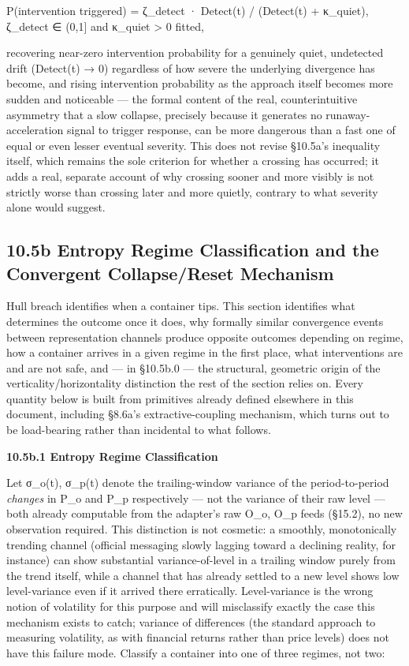 \documentclass[
]{article}
\begin{document}
P(intervention triggered) = ζ\_detect · Detect(t) / (Detect(t) +
κ\_quiet), ζ\_detect ∈ (0,1{]} and κ\_quiet \textgreater{} 0 fitted,

recovering near-zero intervention probability for a genuinely quiet,
undetected drift (Detect(t) → 0) regardless of how severe the underlying
divergence has become, and rising intervention probability as the
approach itself becomes more sudden and noticeable --- the formal
content of the real, counterintuitive asymmetry that a slow collapse,
precisely because it generates no runaway-acceleration signal to trigger
response, can be more dangerous than a fast one of equal or even lesser
eventual severity. This does not revise §10.5a's inequality itself,
which remains the sole criterion for whether a crossing has occurred; it
adds a real, separate account of why crossing sooner and more visibly is
not strictly worse than crossing later and more quietly, contrary to
what severity alone would suggest.

\hypertarget{b-entropy-regime-classification-and-the-convergent-collapsereset-mechanism}{%
\subsection{10.5b Entropy Regime Classification and the Convergent
Collapse/Reset
Mechanism}\label{b-entropy-regime-classification-and-the-convergent-collapsereset-mechanism}}

Hull breach identifies when a container tips. This section identifies
what determines the outcome once it does, why formally similar
convergence events between representation channels produce opposite
outcomes depending on regime, how a container arrives in a given regime
in the first place, what interventions are and are not safe, and --- in
§10.5b.0 --- the structural, geometric origin of the
verticality/horizontality distinction the rest of the section relies on.
Every quantity below is built from primitives already defined elsewhere
in this document, including §8.6a's extractive-coupling mechanism, which
turns out to be load-bearing rather than incidental to what follows.

\textbf{10.5b.1 Entropy Regime Classification}

Let σ\_o(t), σ\_p(t) denote the trailing-window variance of the
period-to-period \emph{changes} in P\_o and P\_p respectively --- not
the variance of their raw level --- both already computable from the
adapter's raw O\_o, O\_p feeds (§15.2), no new observation required.
This distinction is not cosmetic: a smoothly, monotonically trending
channel (official messaging slowly lagging toward a declining reality,
for instance) can show substantial variance-of-level in a trailing
window purely from the trend itself, while a channel that has already
settled to a new level shows low level-variance even if it arrived there
erratically. Level-variance is the wrong notion of volatility for this
purpose and will misclassify exactly the case this mechanism exists to
catch; variance of differences (the standard approach to measuring
volatility, as with financial returns rather than price levels) does not
have this failure mode. Classify a container into one of three regimes,
not two:
\end{document}
